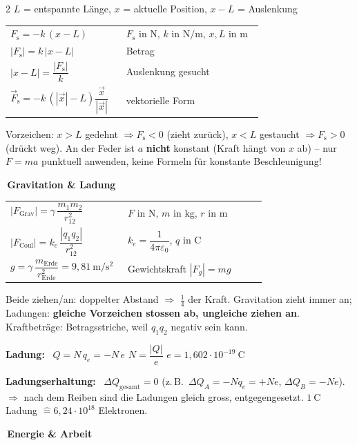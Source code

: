 \documentclass[8pt,a4paper]{extarticle}
\makeatletter
\newcommand{\T}[1]{%
  \vspace{2.2mm plus 0.6mm}%
  \noindent\colorbox{ak}{\color{white}\bfseries\small\,#1\,}\par
  \vspace{0.8mm}\nobreak\ignorespaces}
\newcommand{\FT}[1]{%
  \begin{tabular}{@{}>{\raggedright\arraybackslash}p{0.44\linewidth}@{\hspace{3pt}}>{\raggedright\arraybackslash}p{0.52\linewidth}@{}}
  #1\end{tabular}\par}
\newcommand{\hk}[1]{\textcolor{ak}{\textbf{#1}}}
\makeatother
\begin{document}
\begin{multicols}{2}
$L$ = entspannte Länge, $x$ = aktuelle Position, $x-L$ = Auslenkung

\FT{
$F_{\mathrm{s}} = -k\,(x-L)$ & $F_{\mathrm{s}}$ in $\mathrm{N}$, $k$ in $\mathrm{N/m}$, $x,L$ in $\mathrm{m}$ \\
$|F_{\mathrm{s}}| = k\,|x-L|$ & Betrag \\
$|x-L| = \dfrac{|F_{\mathrm{s}}|}{k}$ & Auslenkung gesucht \\
$\vec F_{\mathrm{s}} = -k\,(|\vec x|-L)\dfrac{\vec x}{|\vec x|}$ & vektorielle Form \\
}

\vspace{0.8mm}
Vorzeichen: $x>L$ gedehnt $\Rightarrow F_{\mathrm{s}}<0$ (zieht zurück), $x<L$ gestaucht $\Rightarrow F_{\mathrm{s}}>0$ (drückt weg).
An der Feder ist $a$ \textbf{nicht} konstant (Kraft hängt von $x$ ab) – nur $F=ma$ punktuell anwenden, keine Formeln für konstante Beschleunigung!

\T{Gravitation \& Ladung}

\FT{
$|F_{\text{Grav}}| = \gamma\,\dfrac{m_1m_2}{r_{12}^2}$ & $F$ in $\mathrm{N}$, $m$ in $\mathrm{kg}$, $r$ in $\mathrm{m}$ \\
$|F_{\text{Coul}}| = k_e\,\dfrac{|q_1q_2|}{r_{12}^2}$ & $k_e=\dfrac{1}{4\pi\varepsilon_0}$, $q$ in $\mathrm{C}$ \\
$g = \gamma\,\dfrac{m_{\text{Erde}}}{r_{\text{Erde}}^2} = 9{,}81\ \mathrm{m/s^2}$ & Gewichtskraft $|F_g|=mg$ \\
}

\vspace{0.8mm}
Beide ziehen/an: doppelter Abstand $\Rightarrow$ \textbf{$\tfrac14$} der Kraft.
Gravitation zieht immer an; Ladungen: \textbf{gleiche Vorzeichen stossen ab, ungleiche ziehen an}.
Kraftbeträge: Betragsstriche, weil $q_1q_2$ negativ sein kann.

\vspace{0.8mm}
\hk{Ladung:} \ $Q = N\,q_e = -N\,e$ \qquad $N = \dfrac{|Q|}{e}$ \qquad $e = 1{,}602\cdot10^{-19}\ \mathrm{C}$

\hk{Ladungserhaltung:} \ $\Delta Q_{\text{gesamt}} = 0$ (z.\,B.\ $\Delta Q_A = -N q_e = +Ne$, $\Delta Q_B = -Ne$).
$\Rightarrow$ nach dem Reiben sind die Ladungen gleich gross, entgegengesetzt.
$1\ \mathrm{C}$ Ladung $\mathrel{\hat=} 6{,}24\cdot10^{18}$ Elektronen.

\T{Energie \& Arbeit}


\end{multicols}
\end{document}
